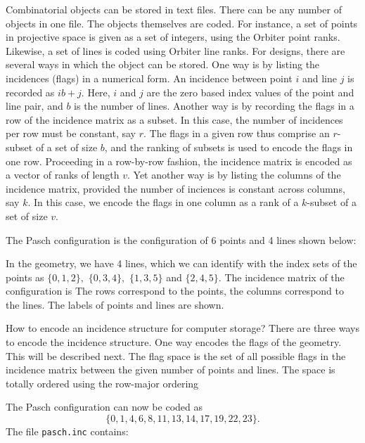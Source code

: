 \bigskip


Combinatorial objects can be stored in text files. 
There can be any number of objects in one file.
The objects themselves are coded. 
For instance, a set of points in projective space 
is given as a set of integers, using the Orbiter point ranks. 
Likewise, a set of lines is coded using Orbiter line ranks. 
For designs, there are several ways in which the object can be stored. 
One way is by listing the incidences (flags) in a numerical form. 
An incidence between point $i$ and line $j$ is recorded as $ib+j.$ 
Here, $i$ and $j$ are the zero based index values of 
the point and line pair, and $b$ is the number of lines.
Another way is by recording the flags in a row of the incidence matrix as a subset. 
In this case, the number of incidences per row must be constant, say $r$. 
The flags in a given row thus comprise an $r$-subset of a set of size $b$, 
and the ranking of subsets is used to encode the flags in one row.
Proceeding in a row-by-row fashion, 
the incidence matrix is encoded as a vector of ranks of length $v$.
Yet another way is by listing the columns of the incidence matrix, 
provided the number of inciences is constant across columns, say $k$. 
In this case, 
we encode the flags in one column as a rank of a $k$-subset of a set of size $v$. 


\bigskip


The Pasch configuration is the configuration of 6 points and 4 lines 
shown below:


In the geometry, we have 4 lines, 
which we can identify with the index sets of the points as
$\{0,1,2\},$ $\{0,3,4\},$ $\{1,3,5\}$ and $\{2,4,5\}.$ 
The incidence matrix of the configuration is 
The rows correspond to the points, the columns correspond to the lines. 
The labels of points and lines are shown. 

\bigskip


How to encode an incidence structure for computer storage?
There are three ways to encode the incidence structure. 
One way encodes the flags of the geometry.
This will be described next.
The flag space is the set of all possible flags 
in the incidence matrix between the given number of points and lines.
The space is totally ordered 
using the row-major ordering


The Pasch configuration can now be coded as 
$$
\{0,1,4,6,8,11,13,14,17,19,22,23\}.
$$
The file \verb'pasch.inc' contains:

